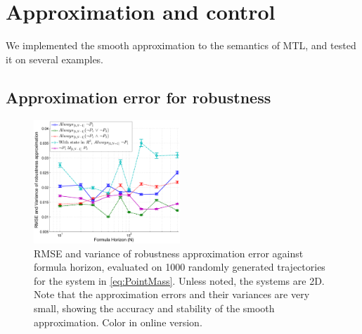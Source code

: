 \section{Approximation and control}
\label{sec:examples}
We implemented the smooth approximation to the semantics of MTL, and tested it on several examples.

\subsection{Approximation error for robustness}
\label{sec: ex apx error}
\begin{figure}[t]
\centering
\includegraphics[width=0.49\textwidth]{figures/RobustnessError_corrected_scissored}
\vspace{-20pt}
\caption{{\small RMSE and variance of robustness approximation error against formula horizon, evaluated on 1000 randomly generated trajectories for the system in \eqref{eq:PointMass}. Unless noted, the systems are 2D. Note that the approximation errors and their variances are very small, showing the accuracy and stability of the smooth approximation. Color in online version.}}
\vspace{-10pt}
\label{fig:sample result}
\end{figure}

